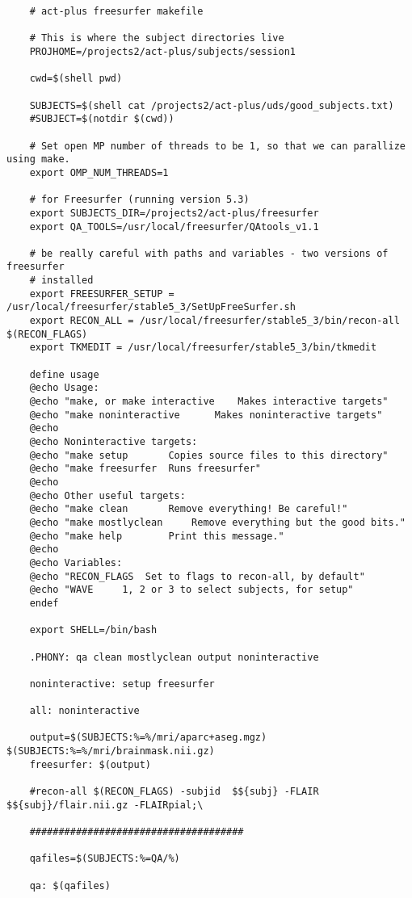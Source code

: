 \begin{verbatim}
	# act-plus freesurfer makefile
	
	# This is where the subject directories live 
	PROJHOME=/projects2/act-plus/subjects/session1
	
	cwd=$(shell pwd)
	
	SUBJECTS=$(shell cat /projects2/act-plus/uds/good_subjects.txt)
	#SUBJECT=$(notdir $(cwd))
	
	# Set open MP number of threads to be 1, so that we can parallize using make.
	export OMP_NUM_THREADS=1
	
	# for Freesurfer (running version 5.3)
	export SUBJECTS_DIR=/projects2/act-plus/freesurfer
	export QA_TOOLS=/usr/local/freesurfer/QAtools_v1.1
	
	# be really careful with paths and variables - two versions of freesurfer
	# installed
	export FREESURFER_SETUP = /usr/local/freesurfer/stable5_3/SetUpFreeSurfer.sh
	export RECON_ALL = /usr/local/freesurfer/stable5_3/bin/recon-all $(RECON_FLAGS)
	export TKMEDIT = /usr/local/freesurfer/stable5_3/bin/tkmedit
	
	define usage
	@echo Usage:
	@echo "make, or make interactive	Makes interactive targets"
	@echo "make noninteractive		Makes noninteractive targets"
	@echo 
	@echo Noninteractive targets:
	@echo "make setup		Copies source files to this directory"
	@echo "make freesurfer	Runs freesurfer"
	@echo
	@echo Other useful targets:
	@echo "make clean		Remove everything! Be careful!"
	@echo "make mostlyclean		Remove everything but the good bits."
	@echo "make help		Print this message."
	@echo
	@echo Variables:
	@echo "RECON_FLAGS	Set to flags to recon-all, by default"
	@echo "WAVE		1, 2 or 3 to select subjects, for setup"
	endef
	
	export SHELL=/bin/bash
	
	.PHONY: qa clean mostlyclean output noninteractive 
	
	noninteractive: setup freesurfer
	
	all: noninteractive
	
	output=$(SUBJECTS:%=%/mri/aparc+aseg.mgz) $(SUBJECTS:%=%/mri/brainmask.nii.gz)
	freesurfer: $(output)
	
	#recon-all $(RECON_FLAGS) -subjid  $${subj} -FLAIR $${subj}/flair.nii.gz -FLAIRpial;\
	
	#####################################
	
	qafiles=$(SUBJECTS:%=QA/%)
	
	qa: $(qafiles)
	

\end{verbatim}

